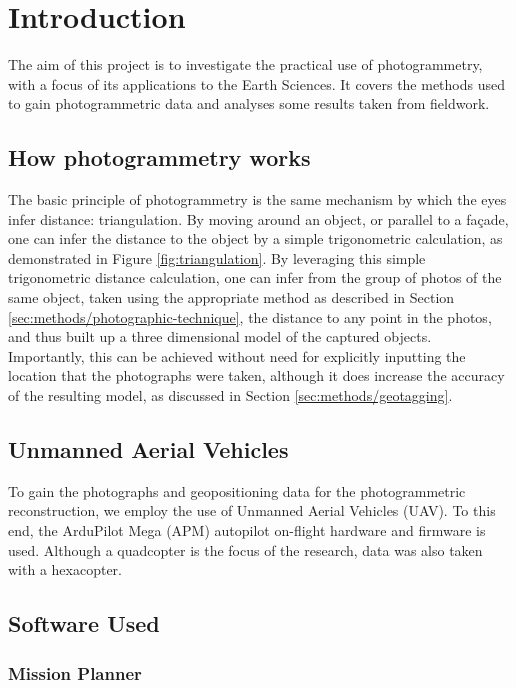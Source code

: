 \section{Introduction}

The aim of this project is to investigate the practical use of photogrammetry,
with a focus of its applications to the Earth Sciences. It covers the methods
used to gain photogrammetric data and analyses some results taken from
fieldwork.

\subsection{How photogrammetry works}

The basic principle of photogrammetry is the same mechanism by which the eyes
infer distance: triangulation. By moving around an object, or parallel to a
façade, one can infer the distance to the object by a simple trigonometric
calculation, as demonstrated in Figure \ref{fig:triangulation}. By leveraging
this simple trigonometric distance calculation, one can infer from the group of
photos of the same object, taken using the appropriate method as described in
Section \ref{sec:methods/photographic-technique}, the distance to any point in
the photos, and thus built up a three dimensional model of the captured objects.
Importantly, this can be achieved without need for explicitly inputting the
location that the photographs were taken, although it does increase the accuracy
of the resulting model, as discussed in Section \ref{sec:methods/geotagging}.

\subsection{Unmanned Aerial Vehicles}

To gain the photographs and geopositioning data for the photogrammetric
reconstruction, we employ the use of Unmanned Aerial Vehicles (UAV). To this
end, the ArduPilot Mega (APM) autopilot
on-flight hardware and firmware is used.  Although a quadcopter is the focus of
the research, data was also taken with a hexacopter.

\subsection{Software Used}

\subsubsection{Mission Planner}

